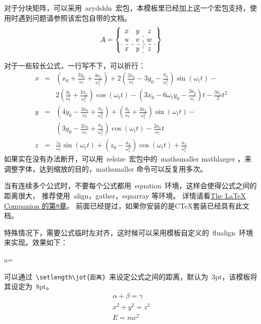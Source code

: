 对于分块矩阵，可以采用~arydshln~宏包，本模板里已经加上这一个宏包支持，使用时遇到问题请参照该宏包自带的文档。
\begin{equation}
A = \left\{ \begin{array}{cc:c} %
 x & y & z \\
 u & v & w \\ \hdashline   %
 x & y & z
 \end{array} \right\}
 \end{equation}


对于一些较长公式，一行写不下，可以折行：
{\setlength\arraycolsep{2pt}
\begin{eqnarray}
x & = & \left( x_{0}+\frac{2\dot{y}_{0}}{\omega_{t}}+\frac{4a_{x}}{\omega_{t}^{2}}\right) +2\left( \frac{2\dot{x}_{0}}{\omega_{t}}-3y_{0}-\frac{a_{y}}{\omega_{t}^{2}}\right) \sin (\omega_{t} t)- \nonumber\\
& & 2\left( \frac{\dot{y}_{0}}{\omega_{t}}+\frac{2a_{x}}{\omega_{t}^{2}}\right) \cos (\omega_{t} t)-\left( 3\dot{x}_{0}-6\omega_{t} y_{0}-\frac{2a_{y}}{\omega_{t}}\right) t-\frac{3a_{x}}{2}t^{2} \\
y & = & \left( 4y_{0}-\frac{2\dot{x}_{0}}{\omega_{t}}+\frac{a_{y}}{\omega_{t}^{2}} \right) +\left( \frac{\dot{y}_{0}}{\omega_{t}}+\frac{2a_{x}}{\omega_{t}^{2}}\right) \sin (\omega_{t} t) -\nonumber\\
& & \left( 3y_{0}-\frac{2\dot{x}_{0}}{\omega_{t}}+\frac{a_{y}}{\omega_{t}^{2}}\right) \cos (\omega_{t}t)-\frac{2a_{x}}{\omega_{t}}t \\
z & = & \frac{\dot{z}_{0}}{\omega_{t}}\sin (\omega_{t}t)+\left( z_{0}-\frac{a_{x}}{\omega_{t}^{2}}\right)\cos (\omega_{t}t)+\frac{a_{z}}{\omega_{t}^{2}}
\end{eqnarray}}
如果实在没有办法断开，可以用~relsize~宏包中的~mathsmaller mathlarger ，来调整字体，达到缩放的目的，mathsmaller 命令可以反复用多次。

当有连续多个公式时，不要每个公式都用~equation~环境，这样会使得公式之间的距离很大，
推荐使用~align，gather，eqnarray 等环境。
详情请看\href{ftp://ftp.ctex.org/pub/tex/documents/bible/LaTeX_Companion_ch8.zip}{The LaTeX Companion 的第8章}。
前面已经提过，如果你安装的是CTeX套装已经具有此文档。

特殊情况下，需要公式临时左对齐，这时候可以采用模板自定义的~flualign~环境来实现。效果如下：
\begin{flualign}
a=\delta
\end{flualign}

可以通过~\verb"\setlength\jot{距离}"~来设定公式之间的距离，默认为~3pt，该模板将其设定为~8pt。
\begin{gather}
\alpha + \beta = \gamma\\
x^2+y^2=z^2\\
E=mc^2
\end{gather}

